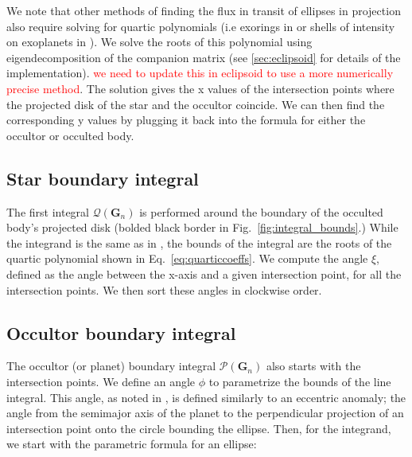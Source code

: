 \documentclass[twocolumn]{aastex631}
\begin{document}
\twocolumngrid
We note that other methods of finding the flux in transit of ellipses in projection also require solving for quartic polynomials (i.e exorings in \citep{rein2023} or shells of intensity on exoplanets in \citep{luger2017}). We solve the roots of this polynomial using eigendecomposition of the companion matrix (see \ref{sec:eclipsoid} for details of the implementation). \textcolor{red}{we need to update this in eclipsoid to use a more numerically precise method}. The solution gives the x values of the intersection points where the projected disk of the star and the occultor coincide. We can then find the corresponding y values by plugging it back into the formula for either the occultor or occulted body. 

\subsection{Star boundary integral}
The first integral $\mathcal{Q}(\mathbf{G}_n)$ is performed around the boundary of the occulted body's projected disk (bolded black border in Fig.~\ref{fig:integral_bounds}.) While the integrand is the same as in \citet{starry2019}, the bounds of the integral are the roots of the quartic polynomial shown in Eq.~\ref{eq:quarticcoeffs}. We compute the angle $\xi$, defined as the angle between the x-axis and a given intersection point, for all the intersection points. We then sort these angles in clockwise order. 

\subsection{Occultor boundary integral}
The occultor (or planet) boundary integral $\mathcal{P}(\mathbf{G}_n)$ also starts with the intersection points. We define an angle $\phi$ to parametrize the bounds of the line integral. This angle, as noted in \citet{dholakia2022}, is defined similarly to an eccentric anomaly; the angle from the semimajor axis of the planet to the perpendicular projection of an intersection point onto the circle bounding the ellipse. Then, for the integrand, we start with the parametric formula for an ellipse:
\end{document}
